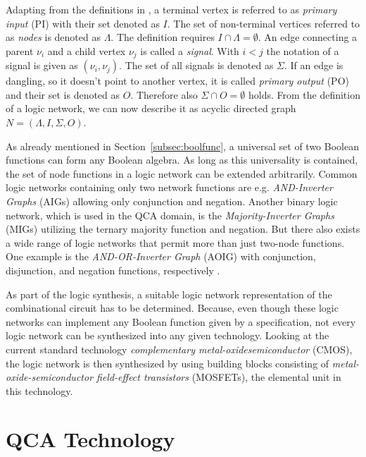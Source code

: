 Adapting from the definitions in \cite{Walter}, a terminal vertex is referred to as \textit{primary input} (PI) with their set denoted as $I$. The set of non-terminal vertices referred to as \textit{nodes} is denoted as $\Lambda$. The definition requires $I \cap \Lambda = \emptyset$. An edge connecting a parent $\nu_i$ and a child vertex $\nu_j$ is called a \textit{signal}. With $i < j$ the notation of a signal is given as $(\nu_i, \nu_j)$. The set of all signals is denoted as $\Sigma$. If an edge is dangling, so it doesn't point to another vertex, it is called \textit{primary output} (PO) and their set is denoted as $O$. Therefore also $\Sigma \cap O = \emptyset$ holds. From the definition of a logic network, we can now describe it as acyclic directed graph $N = (\Lambda, I, \Sigma, O)$.

As already mentioned in Section~\ref{subsec:boolfunc}, a universal set of two Boolean functions can form any Boolean algebra.
As long as this universality is contained, the set of node functions in a logic network can be extended arbitrarily. Common logic networks containing only two network functions are e.g. \textit{AND-Inverter Graphs} (AIGs) \cite{bandyopadhyay2019design} allowing only conjunction and negation. Another binary logic network, which is used in the QCA domain, is the \textit{Majority-Inverter Graphs} (MIGs) \cite{bandyopadhyay2019design} utilizing the ternary majority function and negation. But there also exists a wide range of logic networks that permit more than just two-node functions. One example is the \textit{AND-OR-Inverter Graph} (AOIG) with conjunction, disjunction, and negation functions, respectively \cite{Walter}.

As part of the logic synthesis, a suitable logic network representation of the combinational circuit has to be determined. Because, even though these logic networks can implement any Boolean function given by a specification, not every logic network can be synthesized into any given technology.
Looking at the current standard technology \textit{complementary metal-oxidesemiconductor} (CMOS), the logic network is then synthesized by using building blocks consisting of \textit{metal-oxide-semiconductor field-effect transistors} (MOSFETs), the elemental unit in this technology.

\section{QCA Technology}\label{sec:QCATec}

